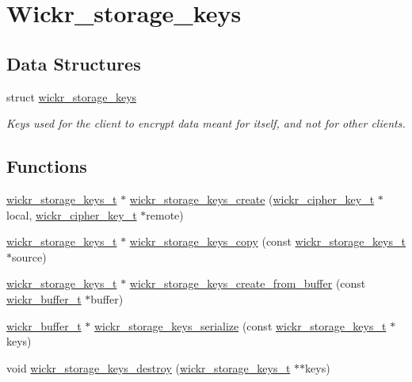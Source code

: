 \hypertarget{group__wickr__storage__keys}{}\section{Wickr\+\_\+storage\+\_\+keys}
\label{group__wickr__storage__keys}
\subsection*{Data Structures}
\begin{DoxyCompactItemize}
\item 
struct \mbox{\hyperlink{structwickr__storage__keys}{wickr\+\_\+storage\+\_\+keys}}
\begin{DoxyCompactList}\small\item\em Key\textquotesingle{}s used for the client to encrypt data meant for itself, and not for other clients. \end{DoxyCompactList}\end{DoxyCompactItemize}
\subsection*{Functions}
\begin{DoxyCompactItemize}
\item 
\mbox{\hyperlink{structwickr__storage__keys}{wickr\+\_\+storage\+\_\+keys\+\_\+t}} $\ast$ \mbox{\hyperlink{group__wickr__storage__keys_gad03ddd5ea10633ca35097e5f4707d5cb}{wickr\+\_\+storage\+\_\+keys\+\_\+create}} (\mbox{\hyperlink{structwickr__cipher__key}{wickr\+\_\+cipher\+\_\+key\+\_\+t}} $\ast$local, \mbox{\hyperlink{structwickr__cipher__key}{wickr\+\_\+cipher\+\_\+key\+\_\+t}} $\ast$remote)
\item 
\mbox{\hyperlink{structwickr__storage__keys}{wickr\+\_\+storage\+\_\+keys\+\_\+t}} $\ast$ \mbox{\hyperlink{group__wickr__storage__keys_gad6839a21bca1c28775d51deb6b7c3835}{wickr\+\_\+storage\+\_\+keys\+\_\+copy}} (const \mbox{\hyperlink{structwickr__storage__keys}{wickr\+\_\+storage\+\_\+keys\+\_\+t}} $\ast$source)
\item 
\mbox{\hyperlink{structwickr__storage__keys}{wickr\+\_\+storage\+\_\+keys\+\_\+t}} $\ast$ \mbox{\hyperlink{group__wickr__storage__keys_gae5631d93182e635fb7f48269eb3f1723}{wickr\+\_\+storage\+\_\+keys\+\_\+create\+\_\+from\+\_\+buffer}} (const \mbox{\hyperlink{structwickr__buffer}{wickr\+\_\+buffer\+\_\+t}} $\ast$buffer)
\item 
\mbox{\hyperlink{structwickr__buffer}{wickr\+\_\+buffer\+\_\+t}} $\ast$ \mbox{\hyperlink{group__wickr__storage__keys_ga10a0d6e13442682b2fecff2ed753c2f6}{wickr\+\_\+storage\+\_\+keys\+\_\+serialize}} (const \mbox{\hyperlink{structwickr__storage__keys}{wickr\+\_\+storage\+\_\+keys\+\_\+t}} $\ast$keys)
\item 
void \mbox{\hyperlink{group__wickr__storage__keys_ga2c1494802577d025d70bf553c43da344}{wickr\+\_\+storage\+\_\+keys\+\_\+destroy}} (\mbox{\hyperlink{structwickr__storage__keys}{wickr\+\_\+storage\+\_\+keys\+\_\+t}} $\ast$$\ast$keys)
\end{DoxyCompactItemize}


